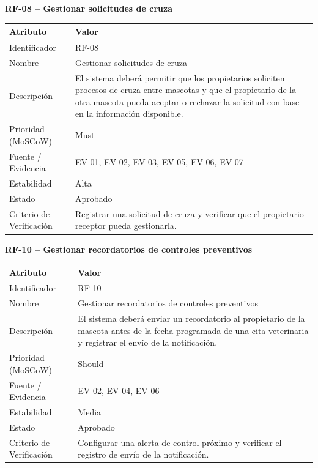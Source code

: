 \documentclass[journal,onecolumn]{IEEEtran}
\begin{document}
	\textbf{RF-08 -- Gestionar solicitudes de cruza}
	\begin{table}[H]
		\centering\small
		\begin{tabularx}{\linewidth}{|l|X|}
			\hline
			\textbf{Atributo} & \textbf{Valor} \\ \hline
			Identificador & RF-08 \\ \hline
			Nombre & Gestionar solicitudes de cruza \\ \hline
			Descripción & El sistema deberá permitir que los propietarios soliciten procesos de cruza entre mascotas y que el propietario de la otra mascota pueda aceptar o rechazar la solicitud con base en la información disponible. \\ \hline
			Prioridad (MoSCoW) & Must \\ \hline
			Fuente / Evidencia & EV-01, EV-02, EV-03, EV-05, EV-06, EV-07 \\ \hline
			Estabilidad & Alta \\ \hline
			Estado & Aprobado \\ \hline
			Criterio de Verificación & Registrar una solicitud de cruza y verificar que el propietario receptor pueda gestionarla. \\ \hline
		\end{tabularx}
	\end{table}
	
	\textbf{RF-10 -- Gestionar recordatorios de controles preventivos}
	\begin{table}[H]
		\centering\small
		\begin{tabularx}{\linewidth}{|l|X|}
			\hline
			\textbf{Atributo} & \textbf{Valor} \\ \hline
			Identificador & RF-10 \\ \hline
			Nombre & Gestionar recordatorios de controles preventivos \\ \hline
			Descripción & El sistema deberá enviar un recordatorio al propietario de la mascota antes de la fecha programada de una cita veterinaria y registrar el envío de la notificación. \\ \hline
			Prioridad (MoSCoW) & Should \\ \hline
			Fuente / Evidencia & EV-02, EV-04, EV-06 \\ \hline
			Estabilidad & Media \\ \hline
			Estado & Aprobado \\ \hline
			Criterio de Verificación & Configurar una alerta de control próximo y verificar el registro de envío de la notificación. \\ \hline
		\end{tabularx}
	\end{table}
	
\end{document}

